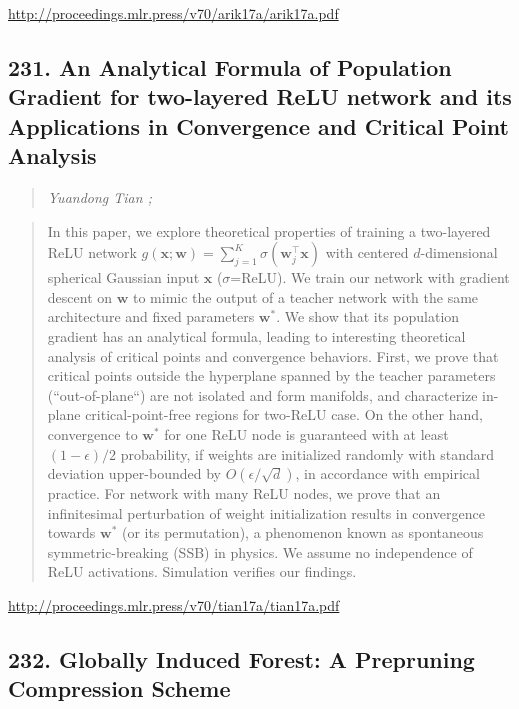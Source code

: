 \documentclass{article}
\begin{document}
\href{http://proceedings.mlr.press/v70/arik17a/arik17a.pdf}{http://proceedings.mlr.press/v70/arik17a/arik17a.pdf}

\subsection{231. An Analytical Formula of Population Gradient for two-layered ReLU network and its Applications in Convergence and Critical Point Analysis}

\begin{quote}
\footnotesize{\textit{Yuandong Tian ;}}
\end{quote}

\begin{quote}
    In this paper, we explore theoretical properties of training a two-layered ReLU network $g(\mathbf{x}; \mathbf{w}) = \sum_{j=1}^K \sigma(\mathbf{w}_j^\top\mathbf{x})$ with centered $d$-dimensional spherical Gaussian input $\mathbf{x}$ ($\sigma$=ReLU). We train our network with gradient descent on $\mathbf{w}$ to mimic the output of a teacher network with the same architecture and fixed parameters $\mathbf{w}^*$. We show that its population gradient has an analytical formula, leading to interesting theoretical analysis of critical points and convergence behaviors. First, we prove that critical points outside the hyperplane spanned by the teacher parameters (“out-of-plane“) are not isolated and form manifolds, and characterize in-plane critical-point-free regions for two-ReLU case. On the other hand, convergence to $\mathbf{w}^*$ for one ReLU node is guaranteed with at least $(1-\epsilon)/2$ probability, if weights are initialized randomly with standard deviation upper-bounded by $O(\epsilon/\sqrt{d})$, in accordance with empirical practice. For network with many ReLU nodes, we prove that an infinitesimal perturbation of weight initialization results in convergence towards $\mathbf{w}^*$ (or its permutation), a phenomenon known as spontaneous symmetric-breaking (SSB) in physics. We assume no independence of ReLU activations. Simulation verifies our findings.  \end{quote}

\href{http://proceedings.mlr.press/v70/tian17a/tian17a.pdf}{http://proceedings.mlr.press/v70/tian17a/tian17a.pdf}

\subsection{232. Globally Induced Forest: A Prepruning Compression Scheme}
\end{document}
